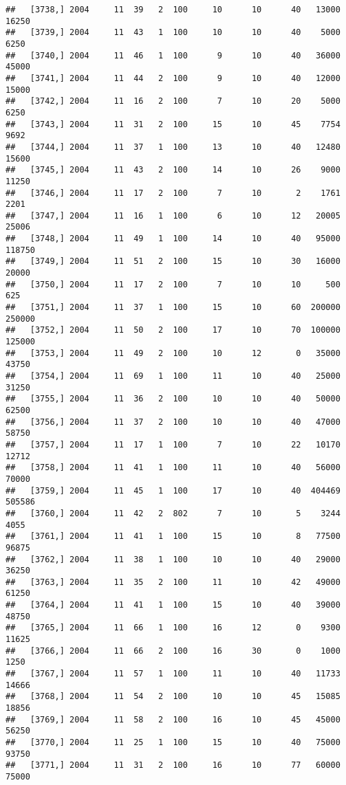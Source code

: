 \documentclass{article}\usepackage[]{graphicx}\usepackage[]{color}
\makeatletter
\newenvironment{kframe}{%
 \def\at@end@of@kframe{}%
 \ifinner\ifhmode%
  \def\at@end@of@kframe{\end{minipage}}%
  \begin{minipage}{\columnwidth}%
 \fi\fi%
 \def\FrameCommand##1{\hskip\@totalleftmargin \hskip-\fboxsep
 \colorbox{shadecolor}{##1}\hskip-\fboxsep
     \hskip-\linewidth \hskip-\@totalleftmargin \hskip\columnwidth}%
 \MakeFramed {\advance\hsize-\width
   \@totalleftmargin\z@ \linewidth\hsize
   \@setminipage}}%
 {\par\unskip\endMakeFramed%
 \at@end@of@kframe}
\newenvironment{knitrout}{}{} %
\makeatother
\begin{document}
\begin{knitrout}
\begin{kframe}
\begin{verbatim}
##   [3738,] 2004     11  39   2  100     10      10      40   13000   16250
##   [3739,] 2004     11  43   1  100     10      10      40    5000    6250
##   [3740,] 2004     11  46   1  100      9      10      40   36000   45000
##   [3741,] 2004     11  44   2  100      9      10      40   12000   15000
##   [3742,] 2004     11  16   2  100      7      10      20    5000    6250
##   [3743,] 2004     11  31   2  100     15      10      45    7754    9692
##   [3744,] 2004     11  37   1  100     13      10      40   12480   15600
##   [3745,] 2004     11  43   2  100     14      10      26    9000   11250
##   [3746,] 2004     11  17   2  100      7      10       2    1761    2201
##   [3747,] 2004     11  16   1  100      6      10      12   20005   25006
##   [3748,] 2004     11  49   1  100     14      10      40   95000  118750
##   [3749,] 2004     11  51   2  100     15      10      30   16000   20000
##   [3750,] 2004     11  17   2  100      7      10      10     500     625
##   [3751,] 2004     11  37   1  100     15      10      60  200000  250000
##   [3752,] 2004     11  50   2  100     17      10      70  100000  125000
##   [3753,] 2004     11  49   2  100     10      12       0   35000   43750
##   [3754,] 2004     11  69   1  100     11      10      40   25000   31250
##   [3755,] 2004     11  36   2  100     10      10      40   50000   62500
##   [3756,] 2004     11  37   2  100     10      10      40   47000   58750
##   [3757,] 2004     11  17   1  100      7      10      22   10170   12712
##   [3758,] 2004     11  41   1  100     11      10      40   56000   70000
##   [3759,] 2004     11  45   1  100     17      10      40  404469  505586
##   [3760,] 2004     11  42   2  802      7      10       5    3244    4055
##   [3761,] 2004     11  41   1  100     15      10       8   77500   96875
##   [3762,] 2004     11  38   1  100     10      10      40   29000   36250
##   [3763,] 2004     11  35   2  100     11      10      42   49000   61250
##   [3764,] 2004     11  41   1  100     15      10      40   39000   48750
##   [3765,] 2004     11  66   1  100     16      12       0    9300   11625
##   [3766,] 2004     11  66   2  100     16      30       0    1000    1250
##   [3767,] 2004     11  57   1  100     11      10      40   11733   14666
##   [3768,] 2004     11  54   2  100     10      10      45   15085   18856
##   [3769,] 2004     11  58   2  100     16      10      45   45000   56250
##   [3770,] 2004     11  25   1  100     15      10      40   75000   93750
##   [3771,] 2004     11  31   2  100     16      10      77   60000   75000

\end{verbatim}
\end{kframe}
\end{knitrout}
\end{document}
